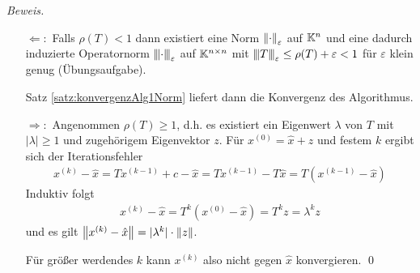 \textit{Beweis.} 
\begin{enumerate}
  \item[$\Leftarrow:$] 
    Falls $\rho(T)<1$ dann existiert eine Norm $\vertn{2}{\cdot}_\varepsilon$ auf $\mathbb K^n$ 
    und eine dadurch induzierte Operatornorm $\vertn{3}{\cdot}_\varepsilon$ auf $\mathbb K^{n\times n}$ 
    mit $\vertn{3}{T}_\varepsilon \leq \rho(T) + \varepsilon < 1$ für $\varepsilon$ klein genug 
    (Übungsaufgabe).

    Satz \ref{satz:konvergenzAlg1Norm} liefert dann die Konvergenz des Algorithmus. 

  \item[$\Rightarrow:$] 
    Angenommen $\rho(T)\geq 1$, d.h. es existiert ein Eigenwert $\lambda$ von $T$ 
    mit $|\lambda|\geq 1$ und zugehörigem Eigenvektor $z$. Für $x^{(0)}=\hat{x}+z$ und festem $k$ 
    ergibt sich der Iterationsfehler
    \begin{align*}
      x^{(k)}-\hat{x} 
      = Tx^{(k-1)}+c-\hat{x} 
      = Tx^{(k-1)}-T\hat{x} 
      = T(x^{(k-1)}-\hat{x})
    \end{align*}
    Induktiv folgt  
    \begin{align*}
      x^{(k)}-\hat{x} 
      = T^k(x^{(0)}-\hat{x})
      =T^kz
      =\lambda^kz
    \end{align*}
    und es gilt $\vertn{2}{x^{(k)}-\hat{x}}=|\lambda^k|\cdot\vertn{2}{z}$.

    Für größer werdendes $k$ kann $x^{(k)}$ also nicht gegen $\hat{x}$ konvergieren. 
    \qed
\end{enumerate}

